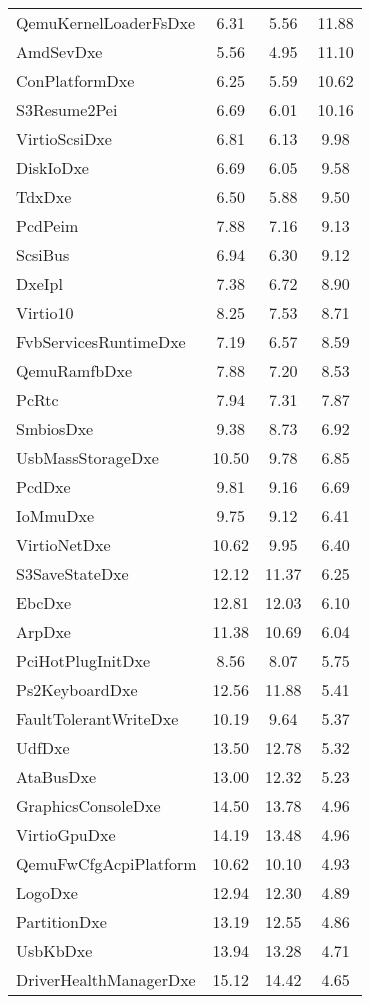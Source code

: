 \begin{longtable}{l c c c}
  QemuKernelLoaderFsDxe & 6.31 & 5.56 & 11.88\\
  AmdSevDxe & 5.56 & 4.95 & 11.10\\
  ConPlatformDxe & 6.25 & 5.59 & 10.62\\
  S3Resume2Pei & 6.69 & 6.01 & 10.16\\
  VirtioScsiDxe & 6.81 & 6.13 & 9.98\\
  DiskIoDxe & 6.69 & 6.05 & 9.58\\
  TdxDxe & 6.50 & 5.88 & 9.50\\
  PcdPeim & 7.88 & 7.16 & 9.13\\
  ScsiBus & 6.94 & 6.30 & 9.12\\
  DxeIpl & 7.38 & 6.72 & 8.90\\
  Virtio10 & 8.25 & 7.53 & 8.71\\
  FvbServicesRuntimeDxe & 7.19 & 6.57 & 8.59\\
  QemuRamfbDxe & 7.88 & 7.20 & 8.53\\
  PcRtc & 7.94 & 7.31 & 7.87\\
  SmbiosDxe & 9.38 & 8.73 & 6.92\\
  UsbMassStorageDxe & 10.50 & 9.78 & 6.85\\
  PcdDxe & 9.81 & 9.16 & 6.69\\
  IoMmuDxe & 9.75 & 9.12 & 6.41\\
  VirtioNetDxe & 10.62 & 9.95 & 6.40\\
  S3SaveStateDxe & 12.12 & 11.37 & 6.25\\
  EbcDxe & 12.81 & 12.03 & 6.10\\
  ArpDxe & 11.38 & 10.69 & 6.04\\
  PciHotPlugInitDxe & 8.56 & 8.07 & 5.75\\
  Ps2KeyboardDxe & 12.56 & 11.88 & 5.41\\
  FaultTolerantWriteDxe & 10.19 & 9.64 & 5.37\\
  UdfDxe & 13.50 & 12.78 & 5.32\\
  AtaBusDxe & 13.00 & 12.32 & 5.23\\
  GraphicsConsoleDxe & 14.50 & 13.78 & 4.96\\
  VirtioGpuDxe & 14.19 & 13.48 & 4.96\\
  QemuFwCfgAcpiPlatform & 10.62 & 10.10 & 4.93\\
  LogoDxe & 12.94 & 12.30 & 4.89\\
  PartitionDxe & 13.19 & 12.55 & 4.86\\
  UsbKbDxe & 13.94 & 13.28 & 4.71\\
  DriverHealthManagerDxe & 15.12 & 14.42 & 4.65\\

\end{longtable}
